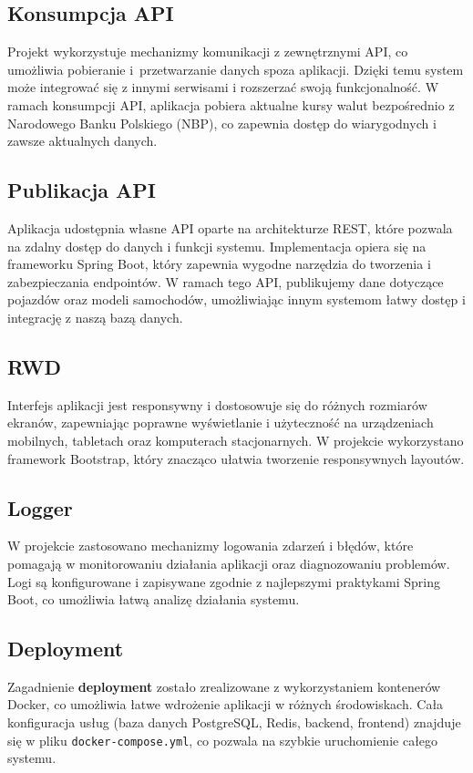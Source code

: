 \documentclass[12pt]{article}
\begin{document}
	\subsection{Konsumpcja API}
	Projekt wykorzystuje mechanizmy komunikacji z zewnętrznymi API, co umożliwia pobieranie i~przetwarzanie danych spoza aplikacji. Dzięki temu system może integrować się z innymi serwisami i rozszerzać swoją funkcjonalność. W ramach konsumpcji API, aplikacja pobiera aktualne kursy walut bezpośrednio z Narodowego Banku Polskiego (NBP), co zapewnia dostęp do wiarygodnych i zawsze aktualnych danych.
	
	\subsection{Publikacja API}
	Aplikacja udostępnia własne API oparte na architekturze REST, które pozwala na zdalny dostęp do danych i funkcji systemu. Implementacja opiera się na frameworku Spring Boot, który zapewnia wygodne narzędzia do tworzenia i zabezpieczania endpointów. W ramach tego API, publikujemy dane dotyczące pojazdów oraz modeli samochodów, umożliwiając innym systemom łatwy dostęp i integrację z naszą bazą danych.
	
	\subsection{RWD}
	Interfejs aplikacji jest responsywny i dostosowuje się do różnych rozmiarów ekranów, zapewniając poprawne wyświetlanie i użyteczność na urządzeniach mobilnych, tabletach oraz komputerach stacjonarnych. W projekcie wykorzystano framework Bootstrap, który znacząco ułatwia tworzenie responsywnych layoutów.
	
	\subsection{Logger}
	W projekcie zastosowano mechanizmy logowania zdarzeń i błędów, które pomagają w monitorowaniu działania aplikacji oraz diagnozowaniu problemów. Logi są konfigurowane i zapisywane zgodnie z najlepszymi praktykami Spring Boot, co umożliwia łatwą analizę działania systemu.
	
	\subsection{Deployment}
	Zagadnienie \textbf{deployment} zostało zrealizowane z wykorzystaniem kontenerów Docker, co umożliwia łatwe wdrożenie aplikacji w różnych środowiskach. Cała konfiguracja usług (baza danych PostgreSQL, Redis, backend, frontend) znajduje się w pliku \texttt{docker-compose.yml}, co pozwala na szybkie uruchomienie całego systemu.
	
	\newpage
	\listoffigures
	\newpage
	\lstlistoflistings
	
\end{document}

